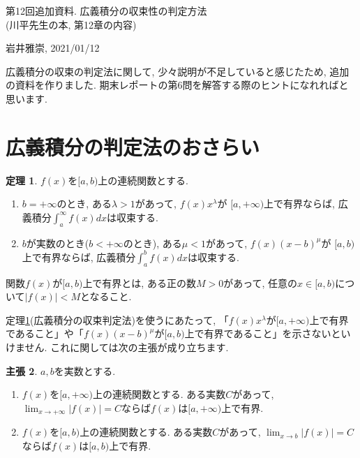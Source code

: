 \documentclass[dvipdfmx,a4paper,11pt]{article}
\theoremstyle{definition}
\newtheorem{thm}{定理}
\newtheorem{claim}[thm]{主張}
\begin{document}
\begin{center}
{\Large 第12回追加資料. 広義積分の収束性の判定方法 \\ (川平先生の本, 第12章の内容)}
\end{center}

\begin{flushright}
 岩井雅崇, 2021/01/12
\end{flushright}

広義積分の収束の判定法に関して, 少々説明が不足していると感じたため, 追加の資料を作りました. 期末レポートの第6問を解答する際のヒントになれればと思います.

\section{広義積分の判定法のおさらい}

  \begin{tcolorbox}[
    colback = white,
    colframe = green!35!black,
    fonttitle = \bfseries,
    breakable = true]
    \begin{thm}
    \label{kougi2}
$f(x)$を$[a,b)$上の連続関数とする.
\begin{enumerate}
\item $b=+ \infty$のとき, ある$\lambda >1$があって, $f(x)x^{\lambda}$が
$[a, +\infty)$上で有界ならば, 広義積分$\int_{a}^{\infty} f(x)dx $は収束する.
\item $b$が実数のとき($b <+ \infty$のとき), ある$\mu <1$があって, $f(x)(x-b)^{\mu}$が
$[a, b)$上で有界ならば, 広義積分$\int_{a}^{b} f(x)dx $は収束する.
\end{enumerate}
 \end{thm}
 \end{tcolorbox}
関数$f(x)$が$[a, b)$上で有界とは, ある正の数$M>0$があって, 任意の$x \in [a, b)$について$|f(x)| < M$となること.

\vspace{11pt}
定理\ref{kougi2}(広義積分の収束判定法)を使うにあたって, 
「$f(x)x^{\lambda}$が$[a, +\infty)$上で有界であること」や「$f(x)(x-b)^{\mu}$が$[a, b)$上で有界であること」を示さないといけません.
これに関しては次の主張が成り立ちます.
\begin{tcolorbox}[
    colback = white,
    colframe = green!35!black,
    fonttitle = \bfseries,
    breakable = true]
    \begin{claim}
    \label{cla2}
 $a,b$を実数とする.
  \begin{enumerate}
\item $f(x)$を$[a,+\infty)$上の連続関数とする.
ある実数$C$があって, $\lim_{x \rightarrow +\infty} |f(x)|=C$ならば$f(x)$は$[a,+\infty)$上で有界.
\item $f(x)$を$[a,b)$上の連続関数とする.
ある実数$C$があって, $\lim_{x \rightarrow b} |f(x)|=C$ならば$f(x)$は$[a,b)$上で有界.
  \end{enumerate}
 \end{claim}
 \end{tcolorbox}
 
\end{document}
